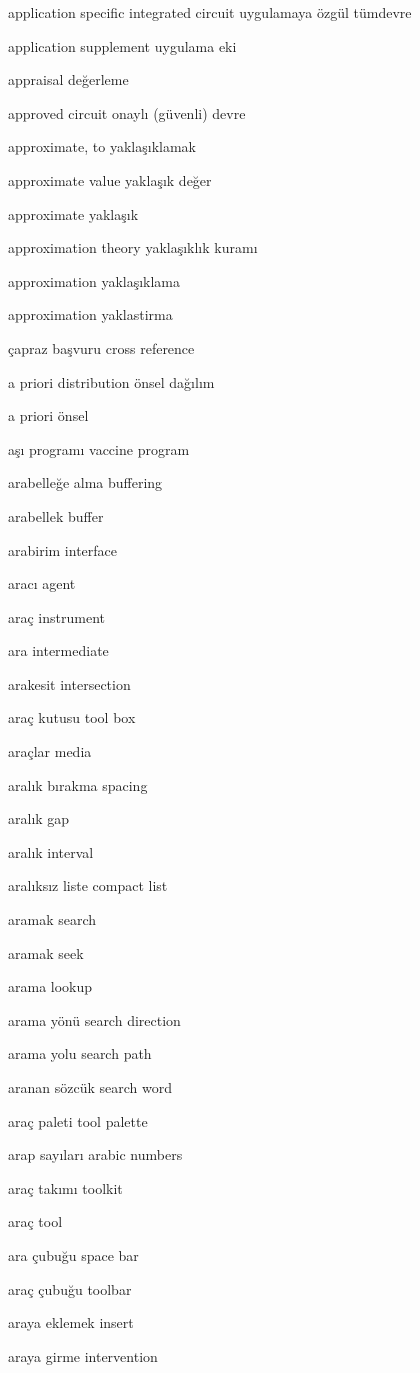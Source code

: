 \documentclass[12pt,fleqn]{article}\usepackage{../../common}
\begin{document}
application specific integrated circuit uygulamaya özgül tümdevre

application supplement uygulama eki

appraisal değerleme

approved circuit onaylı (güvenli) devre

approximate, to yaklaşıklamak

approximate value yaklaşık değer

approximate yaklaşık

approximation theory yaklaşıklık kuramı

approximation yaklaşıklama

approximation yaklastirma

çapraz başvuru cross reference

a priori distribution önsel dağılım

a priori önsel

aşı programı vaccine program

arabelleğe alma buffering

arabellek buffer

arabirim interface

aracı agent

araç instrument

ara intermediate

arakesit intersection

araç kutusu tool box

araçlar media

aralık bırakma spacing

aralık gap

aralık interval

aralıksız liste compact list

aramak search

aramak seek

arama lookup

arama yönü search direction

arama yolu search path

aranan sözcük search word

araç paleti tool palette

arap sayıları arabic numbers

araç takımı toolkit

araç tool

ara çubuğu space bar

araç çubuğu toolbar

araya eklemek insert

araya girme intervention
\end{document}
